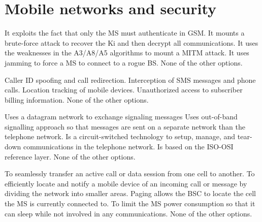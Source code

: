\section{Mobile networks and security}

\begin{checkboxes}
    \CorrectChoice It exploits the fact that only the MS must authenticate in GSM.
    \choice It mounts a brute-force attack to recover the Ki and then decrypt all communications.
    \choice It uses the weaknesses in the A3/A8/A5 algorithms to mount a MITM attack.
    \choice It uses jamming to force a MS to connect to a rogue BS.
    \choice None of the other options.
\end{checkboxes}


\begin{checkboxes}
    \CorrectChoice Caller ID spoofing and call redirection.
    \CorrectChoice Interception of SMS messages and phone calls.
    \CorrectChoice Location tracking of mobile devices.
    \choice Unauthorized access to subscriber billing information.
    \choice None of the other options.
\end{checkboxes}

\begin{checkboxes}
    \CorrectChoice Uses a datagram network to exchange signaling messages
    \CorrectChoice Uses out-of-band signalling approach so that messages are sent on a separate network than the telephone network.
    \choice Is a circuit-switched technology to setup, manage, and tear-down communications in the telephone network.
    \choice Is based on the ISO-OSI reference layer.
    \choice None of the other options.
\end{checkboxes}

\begin{checkboxes}
    \choice To seamlessly transfer an active call or data session from one cell to another.
    \CorrectChoice To efficiently locate and notify a mobile device of an incoming call or message by dividing the network into smaller areas.
    \CorrectChoice Paging allows the BSC to locate the cell the MS is currently connected to.
    \choice To limit the MS power consumption so that it can sleep while not involved in any communications.
    \choice None of the other options.
\end{checkboxes}

